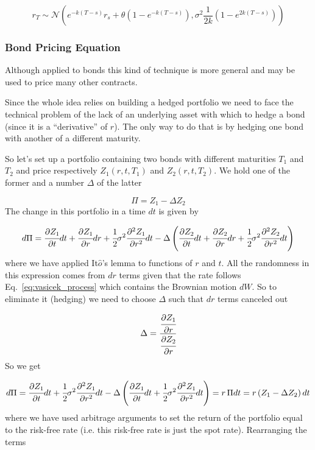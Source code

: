 \begin{equation}
	r_T \sim \mathcal{N}(e^{-k(T-s)} r_s+\theta(1-e^{-k(T-s)}),\sigma^2 \frac {1}{2k}(1-e^{2k(T-s)}))
\end{equation}

\subsubsection{Bond Pricing Equation}\label{bond-pricing-equation}

Although applied to bonds this kind of technique is more
general and may be used to price many other contracts.

Since the whole idea relies on building a hedged portfolio we need to
face the technical problem of the lack of an underlying asset with which
to hedge a bond (since it is a ``derivative'' of \(r\)). The only way to
do that is by hedging one bond with another of a different maturity.

So let's set up a portfolio containing two bonds with different
maturities \(T_1\) and \(T_2\) and price respectively \(Z_1(r, t, T_1)\)
and \(Z_2(r, t, T_2)\). We hold one of the former and a number
\(\Delta\) of the latter

\begin{equation*}
	\Pi = Z_1 − \Delta Z_2
\end{equation*}
The change in this portfolio in a time \(dt\) is given by

\begin{equation*}
	d\Pi = \cfrac{\partial Z_1}{\partial t}dt + \cfrac{\partial Z_1}{\partial r}dr + \cfrac{1}{2}\sigma^2 \cfrac{\partial^2 Z_1}{\partial r^2}dt - \Delta\left(\cfrac{\partial Z_2}{\partial t}dt + \cfrac{\partial Z_2}{\partial r}dr + \cfrac{1}{2}\sigma^2 \cfrac{\partial^2 Z_2}{\partial r^2}dt\right)
\end{equation*}
where we have applied It\(\hat{o}\)'s lemma to functions of \(r\) and
\(t\). All the randomness in this expression comes from \(dr\) terms
given that the rate follows Eq.~\ref{eq:vasicek_process} which contains the Brownian
motion \(dW\). So to eliminate it (hedging) we need to choose \(\Delta\)
such that \(dr\) terms canceled out

\begin{equation*}
	\Delta = \cfrac{\cfrac{\partial Z_1}{\partial r}}{\cfrac{\partial Z_2}{\partial r}}
\end{equation*}
So we get

\begin{equation*}
	d\Pi = \cfrac{\partial Z_1}{\partial t}dt + \cfrac{1}{2}\sigma^2 \cfrac{\partial^2 Z_1}{\partial r^2}dt - \Delta\left(\cfrac{\partial Z_1}{\partial t}dt + \cfrac{1}{2}\sigma^2 \cfrac{\partial^2 Z_1}{\partial r^2}dt\right) = r\, \Pi dt = r \left(Z_1 - \Delta Z_2\right)dt
\end{equation*}
where we have used arbitrage arguments to set the return of the
portfolio equal to the risk-free rate (i.e. this risk-free rate is just
the spot rate). Rearranging the terms

